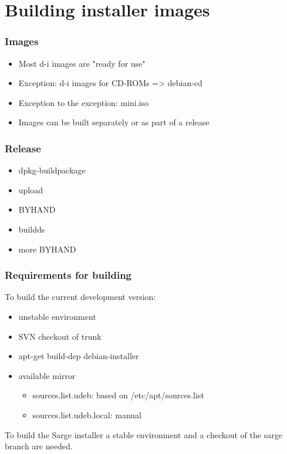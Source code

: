 \documentclass{beamer}
\begin{document}
\section{Building installer images}

\begin{frame}
  \frametitle{Images}
	\begin{itemize}
	\item
		Most d-i images are "ready for use"
	\item
		Exception: d-i images for CD-ROMs => debian-cd
	\item
		Exception to the exception: mini.iso
	\item
		Images can be built separately or as part of a release
	\end{itemize}
\end{frame}

\begin{frame}
  \frametitle{Release}
	\begin{itemize}
	\item
		dpkg-buildpackage
	\item
		upload
	\item
		BYHAND
	\item
		buildds
	\item
		more BYHAND
	\end{itemize}
\end{frame}

\begin{frame}
  \frametitle{Requirements for building}
	To build the current development version:
	\begin{itemize}
	\item
		unstable environment
	\item
		SVN checkout of trunk
	\item
		apt-get build-dep debian-installer
	\item
		available mirror
		\begin{itemize}
		\item
			sources.list.udeb: based on /etc/apt/sources.list
		\item
			sources.list.udeb.local: manual
		\end{itemize}
	\end{itemize}
	To build the Sarge installer a stable environment and
	a checkout of the sarge branch are needed.
\end{frame}
\end{document}
